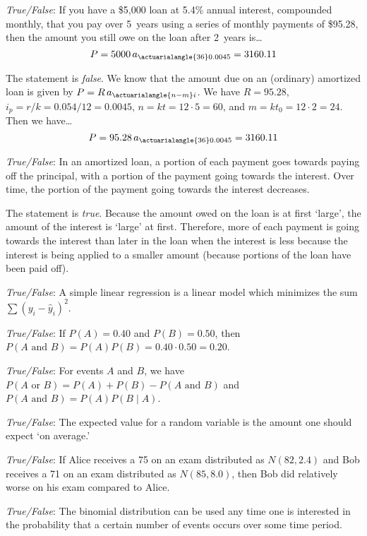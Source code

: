 \documentclass[11pt,letterpaper]{article}
\begin{document}
\newpage



\quizsol \textit{True/False}: If you have a \$5,000 loan at 5.4\% annual interest, compounded monthly, that you pay over 5~years using a series of monthly payments of \$95.28, then the amount you still owe on the loan after 2~years is\dots
	\[
	P= 5000\, a_{\actuarialangle{36}0.0045}= 3160.11
	\] \pspace

\sol The statement is \textit{false}. We know that the amount due on an (ordinary) amortized loan is given by $P= R\, a_{\actuarialangle{n - m}i}$. We have $R= 95.28$, $i_p= r/k= 0.054/12= 0.0045$, $n= kt= 12 \cdot 5= 60$, and $m= kt_0= 12 \cdot 2= 24$. Then we have\dots
	\[
	P= 95.28\, a_{\actuarialangle{36}0.0045}= 3160.11
	\] \pvspace{1.3cm}



\quizsol \textit{True/False}: In an amortized loan, a portion of each payment goes towards paying off the principal, with a portion of the payment going towards the interest. Over time, the portion of the payment going towards the interest decreases. \pspace

\sol The statement is \textit{true}. Because the amount owed on the loan is at first `large', the amount of the interest is `large' at first. Therefore, more of each payment is going towards the interest than later in the loan when the interest is less because the interest is being applied to a smaller amount (because portions of the loan have been paid off). 


\quizsol \textit{True/False}: A simple linear regression is a linear model which minimizes the sum $\sum (y_i - \widehat{y}_i)^2$. 


\quizsol \textit{True/False}: If $P(A)= 0.40$ and $P(B)= 0.50$, then $P(A \text{ and } B)= P(A) P(B)= 0.40 \cdot 0.50= 0.20$. 

\quizsol \textit{True/False}: For events $A$ and $B$, we have $P(A \text{ or } B)= P(A) + P(B) - P(A \text{ and } B)$ and $P(A \text{ and } B)= P(A) P(B \;|\; A)$. 


\quizsol \textit{True/False}: The expected value for a random variable is the amount one should expect `on average.' 

\quizsol \textit{True/False}: If Alice receives a 75 on an exam distributed as $N(82, 2.4)$ and Bob receives a 71 on an exam distributed as $N(85, 8.0)$, then Bob did relatively worse on his exam compared to Alice. 




\quizsol \textit{True/False}: The binomial distribution can be used any time one is interested in the probability that a certain number of events occurs over some time period. 
\end{document}
